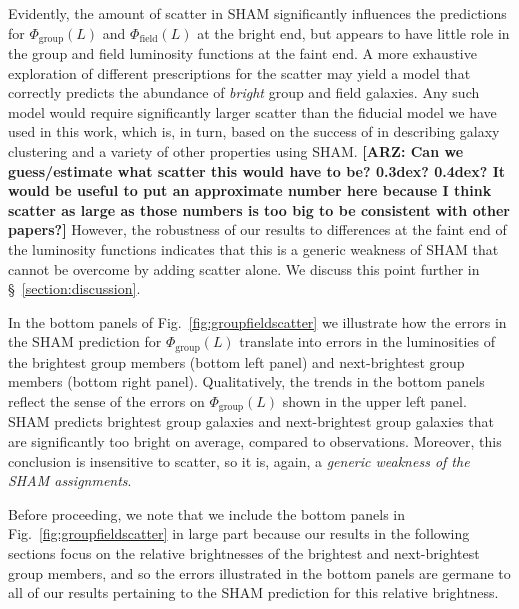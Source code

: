 \documentclass[usenatbib,usegraphicx,letterpaper]{mn2e}
\begin{document}
Evidently, the amount of scatter in SHAM significantly influences the predictions 
for $\Phi_{\mathrm{group}}(L)$ and $\Phi_{\mathrm{field}}(L)$ at the bright end, 
but appears to have little role in the group and field luminosity functions at 
the faint end. A more exhaustive exploration of different prescriptions for 
the scatter may yield a model that correctly predicts the abundance of {\em bright} 
group and field galaxies. Any such model would require significantly larger scatter 
than the fiducial model we have used in this work, which is, in turn, based on the 
success of \citet{trujillo-gomez_etal11} in describing galaxy clustering and 
a variety of other properties using SHAM.  {\bf [ARZ: Can we guess/estimate 
what scatter this would have to be?  0.3dex? 0.4dex?  It would be 
useful to put an approximate number here because I think scatter 
as large as those numbers is too big to be consistent with other papers?]}
However, the robustness of our results to differences at the faint end of the 
luminosity functions indicates that this is a generic weakness of SHAM that cannot 
be overcome by adding scatter alone. We discuss this point further in \S~\ref{section:discussion}.


In the bottom panels of Fig.~\ref{fig:groupfieldscatter} we illustrate how the 
errors in the SHAM prediction for $\Phi_{\mathrm{group}}(L)$ translate into errors 
in the luminosities of the brightest group members (bottom left panel) and 
next-brightest group members (bottom right panel). Qualitatively, the trends 
in the bottom panels reflect the sense of the errors on $\Phi_{\mathrm{group}}(L)$ 
shown in the upper left panel. SHAM predicts brightest group galaxies and 
next-brightest group galaxies that are significantly too bright on average, 
compared to observations.  Moreover, this conclusion is insensitive to scatter, 
so it is, again, a {\em generic weakness of the SHAM assignments}.  


Before proceeding, we note that we include the bottom panels in 
Fig.~\ref{fig:groupfieldscatter} in large part because our results in 
the following sections focus on the relative brightnesses of the 
brightest and next-brightest group members, and so the errors illustrated 
in the bottom panels are germane to all of our results pertaining to the 
SHAM prediction for this relative brightness.
\end{document}
